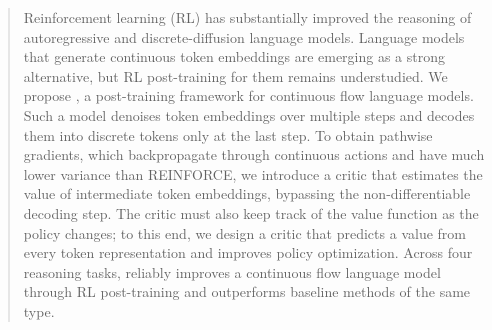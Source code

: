 \begin{abstract}
Reinforcement learning (RL) has substantially improved the reasoning of autoregressive and discrete-diffusion language models. Language models that generate continuous token embeddings are emerging as a strong alternative, but RL post-training for them remains understudied. We propose \method{}, a post-training framework for continuous flow language models. Such a model denoises token embeddings over multiple steps and decodes them into discrete tokens only at the last step. To obtain pathwise gradients, which backpropagate through continuous actions and have much lower variance than REINFORCE, we introduce a critic that estimates the value of intermediate token embeddings, bypassing the non-differentiable decoding step. The critic must also keep track of the value function as the policy changes; to this end, we design a critic that predicts a value from every token representation and improves policy optimization. Across four reasoning tasks, \method{} reliably improves a continuous flow language model through RL post-training and outperforms baseline methods of the same type.
\end{abstract}
